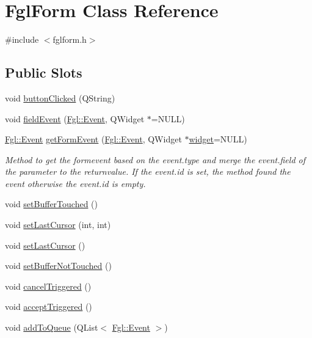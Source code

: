 \hypertarget{classFglForm}{
\section{FglForm Class Reference}
\label{classFglForm}
}


{\ttfamily \#include $<$fglform.h$>$}

\subsection*{Public Slots}
\begin{DoxyCompactItemize}
\item 
void \hyperlink{classFglForm_a0ee0e2722721bf18a2809e670e0777cf}{buttonClicked} (QString)
\item 
void \hyperlink{classFglForm_a1fd5cabc8ec447738e4420f618d69ca7}{fieldEvent} (\hyperlink{structFgl_1_1Event}{Fgl::Event}, QWidget $\ast$=NULL)
\item 
\hyperlink{structFgl_1_1Event}{Fgl::Event} \hyperlink{classFglForm_a8ce69fa40e651b0238b3efbe64bb7ef7}{getFormEvent} (\hyperlink{structFgl_1_1Event}{Fgl::Event}, QWidget $\ast$\hyperlink{classFglForm_a15cd139d56b40da6de43a6bb4d438c0d}{widget}=NULL)
\begin{DoxyCompactList}\small\item\em Method to get the formevent based on the event.type and merge the event.field of the parameter to the returnvalue. If the event.id is set, the method found the event otherwise the event.id is empty. \item\end{DoxyCompactList}\item 
void \hyperlink{classFglForm_a763db4c754333829447f9766c25f0e0b}{setBufferTouched} ()
\item 
void \hyperlink{classFglForm_a8495f6c9444756a6bdf370c3ce158921}{setLastCursor} (int, int)
\item 
void \hyperlink{classFglForm_ab61a1af085f68fa6673e516812b0b9c8}{setLastCursor} ()
\item 
void \hyperlink{classFglForm_a7146bdb938bcb9a88b23051b39ea19b7}{setBufferNotTouched} ()
\item 
void \hyperlink{classFglForm_a21cf637edb3ad010d7e00e4d20b95825}{cancelTriggered} ()
\item 
void \hyperlink{classFglForm_afd623938967b4f76707704ab67032a57}{acceptTriggered} ()
\item 
void \hyperlink{classFglForm_a21e6b7f851487d6d0db29b015a37e374}{addToQueue} (QList$<$ \hyperlink{structFgl_1_1Event}{Fgl::Event} $>$)

\end{DoxyCompactItemize}
